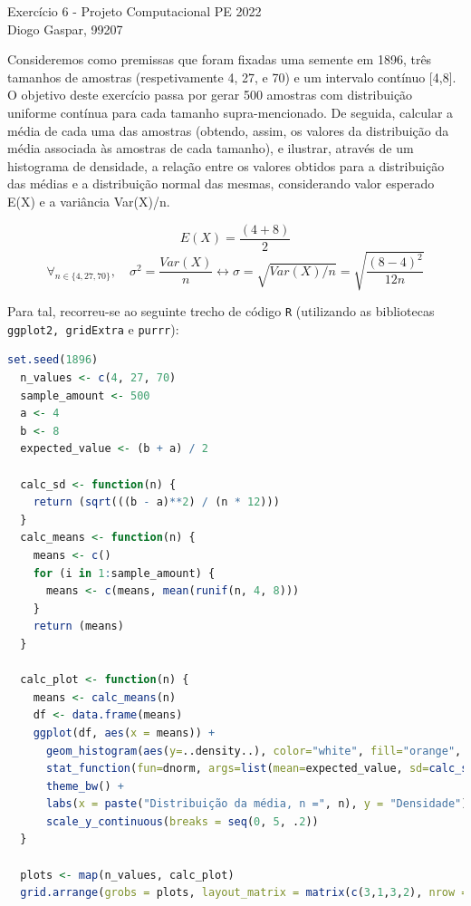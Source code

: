 \documentclass[11pt]{article}
\newcommand{\gaspar}{Diogo Gaspar, 99207}
\begin{document}
\begin{center}
{\huge{Exercício 6 - Projeto Computacional PE 2022}} \\
\vspace{1.5mm}
{\large{\gaspar}} \\
\end{center}

Consideremos como premissas que foram fixadas uma semente em 1896, três
tamanhos de amostras (respetivamente 4, 27, e 70) e um intervalo contínuo [4,8].
O objetivo deste exercício passa por gerar 500 amostras com distribuição uniforme
contínua para cada tamanho supra-mencionado. De seguida, calcular a média de cada uma
das amostras (obtendo, assim, os valores da distribuição da média associada às amostras
de cada tamanho), e ilustrar, através de um histograma de densidade, a
relação entre os valores obtidos para a distribuição das médias e a distribuição normal
das mesmas, considerando valor esperado E(X) e a variância Var(X)/n.

$$
E(X) = \frac{(4 + 8)}{2}
$$
$$
\forall_{n \in \{4, 27, 70\}}, \quad \sigma^2 = \frac{Var(X)}{n} \leftrightarrow \sigma = \sqrt{Var(X) / n} = \sqrt{\frac{(8 - 4)^2}{12n}}
$$

\vspace{0.5mm}
Para tal, recorreu-se ao seguinte trecho de código \texttt{R} (utilizando as bibliotecas \texttt{ggplot2, gridExtra} e \texttt{purrr}):

\begin{lstlisting}[language=R]
  set.seed(1896)
  n_values <- c(4, 27, 70)
  sample_amount <- 500
  a <- 4
  b <- 8
  expected_value <- (b + a) / 2

  calc_sd <- function(n) {
    return (sqrt(((b - a)**2) / (n * 12)))
  }
  calc_means <- function(n) {
    means <- c()
    for (i in 1:sample_amount) {
      means <- c(means, mean(runif(n, 4, 8)))
    }
    return (means)
  }

  calc_plot <- function(n) {
    means <- calc_means(n)
    df <- data.frame(means)
    ggplot(df, aes(x = means)) +
      geom_histogram(aes(y=..density..), color="white", fill="orange", bins=40) +
      stat_function(fun=dnorm, args=list(mean=expected_value, sd=calc_sd(n))) +
      theme_bw() +
      labs(x = paste("Distribuição da média, n =", n), y = "Densidade") +
      scale_y_continuous(breaks = seq(0, 5, .2))
  }

  plots <- map(n_values, calc_plot)
  grid.arrange(grobs = plots, layout_matrix = matrix(c(3,1,3,2), nrow = 2))
\end{lstlisting}
\end{document}
